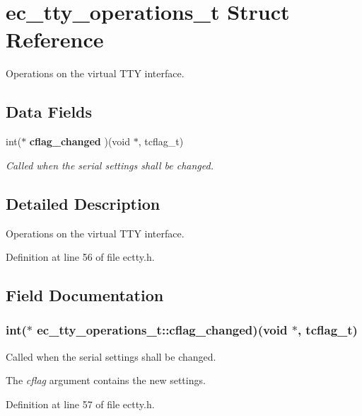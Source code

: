 \section{ec\-\_\-tty\-\_\-operations\-\_\-t Struct Reference}
\label{structec__tty__operations__t}


Operations on the virtual T\-T\-Y interface.  


\subsection*{Data Fields}
\begin{DoxyCompactItemize}
\item 
int($\ast$ {\bf cflag\-\_\-changed} )(void $\ast$, tcflag\-\_\-t)
\begin{DoxyCompactList}\small\item\em Called when the serial settings shall be changed. \end{DoxyCompactList}\end{DoxyCompactItemize}


\subsection{Detailed Description}
Operations on the virtual T\-T\-Y interface. 

Definition at line 56 of file ectty.\-h.



\subsection{Field Documentation}
\subsubsection[{cflag\-\_\-changed}]{\setlength{\rightskip}{0pt plus 5cm}int($\ast$ ec\-\_\-tty\-\_\-operations\-\_\-t\-::cflag\-\_\-changed)(void $\ast$, tcflag\-\_\-t)}\label{structec__tty__operations__t_a771c650a9bc4c8c47c28c653c63f3993}


Called when the serial settings shall be changed. 

The {\itshape cflag} argument contains the new settings. 

Definition at line 57 of file ectty.\-h.

